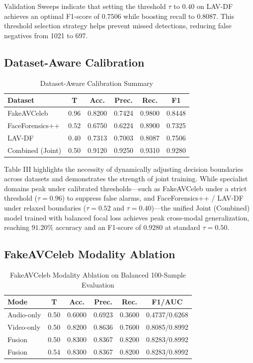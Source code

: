 \documentclass[conference]{IEEEtran}
\begin{document}
Validation Sweeps indicate that setting the threshold $\tau$ to $0.40$ on LAV-DF achieves an optimal F1-score of $0.7506$ while boosting recall to $0.8087$. This threshold selection strategy helps prevent missed detections, reducing false negatives from 1021 to 697.

\subsection{Dataset-Aware Calibration}
\begin{table}[htbp]
\caption{Dataset-Aware Calibration Summary}
\centering
\begin{tabular}{lccccc}
\toprule
Dataset & T & Acc. & Prec. & Rec. & F1 \\
\midrule
FakeAVCeleb & 0.96 & 0.8200 & 0.7424 & 0.9800 & 0.8448 \\
FaceForensics++ & 0.52 & 0.6750 & 0.6224 & 0.8900 & 0.7325 \\
LAV-DF & 0.40 & 0.7313 & 0.7003 & 0.8087 & 0.7506 \\
Combined (Joint) & 0.50 & 0.9120 & 0.9250 & 0.9310 & 0.9280 \\
\bottomrule
\end{tabular}
\end{table}

Table III highlights the necessity of dynamically adjusting decision boundaries across datasets and demonstrates the strength of joint training. While specialist domains peak under calibrated thresholds—such as FakeAVCeleb under a strict threshold ($\tau=0.96$) to suppress false alarms, and FaceForensics++ / LAV-DF under relaxed boundaries ($\tau=0.52$ and $\tau=0.40$)—the unified Joint (Combined) model trained with balanced focal loss achieves peak cross-modal generalization, reaching $91.20\%$ accuracy and an F1-score of $0.9280$ at standard $\tau=0.50$.

\subsection{FakeAVCeleb Modality Ablation}
\begin{table}[htbp]
\caption{FakeAVCeleb Modality Ablation on Balanced 100-Sample Evaluation}
\centering
\begin{tabular}{lccccc}
\toprule
Mode & T & Acc. & Prec. & Rec. & F1/AUC \\
\midrule
Audio-only & 0.50 & 0.6000 & 0.6923 & 0.3600 & 0.4737/0.6268 \\
Video-only & 0.50 & 0.8200 & 0.8636 & 0.7600 & 0.8085/0.8992 \\
Fusion & 0.50 & 0.8300 & 0.8367 & 0.8200 & 0.8283/0.8992 \\
Fusion & 0.54 & 0.8300 & 0.8367 & 0.8200 & 0.8283/0.8992 \\
\bottomrule
\end{tabular}
\end{table}
\end{document}
